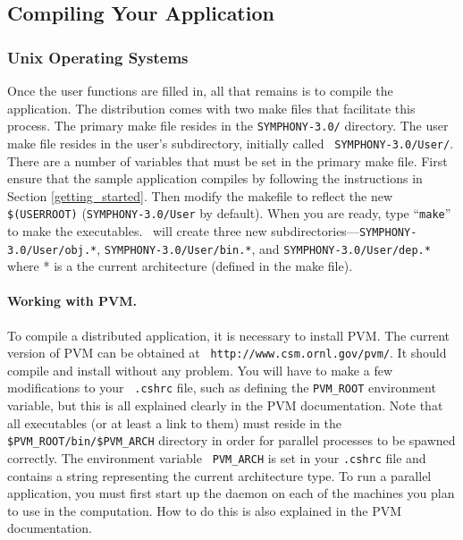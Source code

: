 \subsection{Compiling Your Application}

\subsubsection{Unix Operating Systems}

Once the user functions are filled in, all that remains is to compile the
application. The distribution comes with two make files that facilitate this
process. The primary make file resides in the {\tt SYMPHONY-3.0/} directory.
The user make file resides in the user's subdirectory, initially called {\tt
SYMPHONY-3.0/User/}. There are a number of variables that must be set in the
primary make file. First ensure that the sample application compiles by
following the instructions in Section \ref{getting_started}. Then modify the
makefile to reflect the new {\tt \$(USERROOT)} ({\tt SYMPHONY-3.0/User} by
default). When you are ready, type ``{\tt make}'' to make the executables.
\BB\ will create three new subdirectories---{\tt SYMPHONY-3.0/User/obj.*}, 
{\tt SYMPHONY-3.0/User/bin.*}, and {\tt SYMPHONY-3.0/User/dep.*} where *
is a the current architecture (defined in the make file).

\paragraph{Working with PVM.}
\label{PVM}
To compile a distributed application, it is necessary to install PVM.
The current version of PVM can be obtained at {\tt
{}
{http://www.csm.ornl.gov/pvm/}}. It should compile and install without
any problem. You will have to make a few modifications to your {\tt
.cshrc} file, such as defining the {\tt PVM\_ROOT} environment
variable, but this is all explained clearly in the PVM documentation.
Note that all executables (or at least a link to them) must reside in
the {\tt \$PVM\_ROOT/bin/\$PVM\_ARCH} directory in order for parallel
processes to be spawned correctly. The environment variable {\tt
PVM\_ARCH} is set in your {\tt .cshrc} file and contains a string
representing the current architecture type. To run a parallel
application, you must first start up the daemon on each of the
machines you plan to use in the computation. How to do this is also
explained in the PVM documentation.

